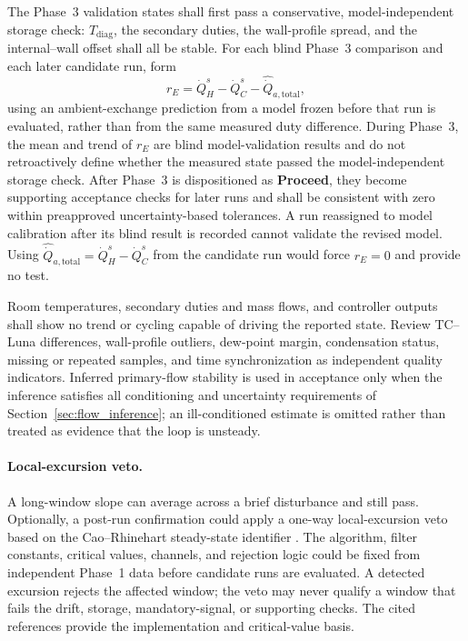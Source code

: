 \documentclass[11pt]{article}
\newcommand{\Tdiag}{T_{\mathrm{diag}}}
\newcommand{\QHs}{\dot Q_{H}^{s}}
\newcommand{\QCs}{\dot Q_{C}^{s}}
\begin{document}
The Phase~3 validation states shall first pass a conservative, model-independent storage check: $\Tdiag$, the secondary duties, the wall-profile spread, and the internal--wall offset shall all be stable. For each blind Phase~3 comparison and each later candidate run, form
\begin{equation}
    r_E
    =
    \QHs-\QCs-\widehat{\dot Q}_{a,\mathrm{total}},
    \label{eq:energy_residual}
\end{equation}
using an ambient-exchange prediction from a model frozen before that run is evaluated, rather than from the same measured duty difference. During Phase~3, the mean and trend of $r_E$ are blind model-validation results and do not retroactively define whether the measured state passed the model-independent storage check. After Phase~3 is dispositioned as \textbf{Proceed}, they become supporting acceptance checks for later runs and shall be consistent with zero within preapproved uncertainty-based tolerances. A run reassigned to model calibration after its blind result is recorded cannot validate the revised model. Using $\widehat{\dot Q}_{a,\mathrm{total}}=\QHs-\QCs$ from the candidate run would force $r_E=0$ and provide no test.

Room temperatures, secondary duties and mass flows, and controller outputs shall show no trend or cycling capable of driving the reported state. Review TC--Luna differences, wall-profile outliers, dew-point margin, condensation status, missing or repeated samples, and time synchronization as independent quality indicators. Inferred primary-flow stability is used in acceptance only when the inference satisfies all conditioning and uncertainty requirements of Section~\ref{sec:flow_inference}; an ill-conditioned estimate is omitted rather than treated as evidence that the loop is unsteady.

\paragraph{Local-excursion veto.}
A long-window slope can average across a brief disturbance and still pass. Optionally, a post-run confirmation could apply a one-way local-excursion veto based on the Cao--Rhinehart steady-state identifier \cite{cao1995,cao1997}. The algorithm, filter constants, critical values, channels, and rejection logic could be fixed from independent Phase~1 data before candidate runs are evaluated. A detected excursion rejects the affected window; the veto may never qualify a window that fails the drift, storage, mandatory-signal, or supporting checks. The cited references provide the implementation and critical-value basis.
\end{document}
